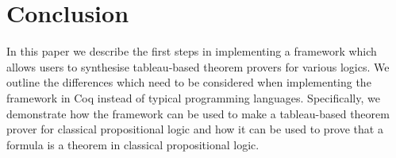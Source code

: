 \documentclass{llncs}
\begin{document}
\section{Conclusion}
%
In this paper we describe the first steps in implementing a framework which
allows users to synthesise tableau-based theorem provers for various logics.
We outline the differences which need to be considered when implementing the
framework in Coq instead of typical programming languages.  Specifically, we
demonstrate how the framework can be used to make a tableau-based theorem
prover for classical propositional logic and how it can be used to prove that a
formula is a theorem in classical propositional logic.
%


%
\end{document}
